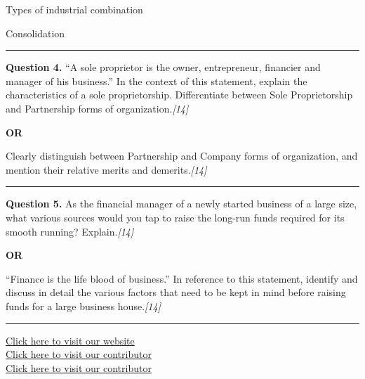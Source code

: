 \documentclass[11pt,a4paper]{article}
\newcommand{\pts}[1]{\hfill   \textit{[#1]}}
\begin{document}
\begin{parts}
  \item Types of industrial combination
  \item Consolidation
\end{parts}

\medskip\rule{\linewidth}{0.2pt}




\noindent   \textbf{Question 4.}
``A sole proprietor is the owner, entrepreneur, financier and manager of his business.'' In the context of this statement, explain the characteristics of a sole proprietorship. Differentiate between Sole Proprietorship and Partnership forms of organization.\pts{14}

\centerline{   \textbf{OR}}

Clearly distinguish between Partnership and Company forms of organization, and mention their relative merits and demerits.\pts{14}

\medskip\rule{\linewidth}{0.2pt}




\noindent   \textbf{Question 5.}
As the financial manager of a newly started business of a large size, what various sources would you tap to raise the long-run funds required for its smooth running? Explain.\pts{14}

\centerline{   \textbf{OR}}

``Finance is the life blood of business.'' In reference to this statement, identify and discuss in detail the various factors that need to be kept in mind before raising funds for a large business house.\pts{14}

\vfill
\rule{\linewidth}{0.4pt}

\begin{center}\small
\href{https://bhu-exam.vercel.app/}{Click here to visit our website}\\[4pt]
\href{https://me-aryan.vercel.app/}{Click here to visit our contributor}\\[4pt]
\href{https://quashan-me.vercel.app/}{Click here to visit our contributor}
\end{center}
\end{document}
